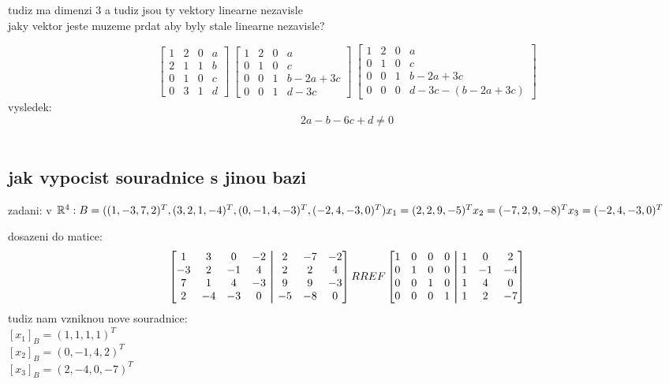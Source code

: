 \documentclass[a4paper]{article}
\newcommand\aug{\fboxsep=-\fboxrule\!\!\!\fbox{\strut}\!\!\!}
\begin{document}
tudiz ma dimenzi 3 a tudiz jsou ty vektory linearne nezavisle
\\
jaky vektor jeste muzeme prdat aby byly stale linearne nezavisle?

$$
\begin{bmatrix}
	1 & 2 & 0 & a \\
	2 & 1 & 1 & b \\
	0 & 1 & 0 & c \\
	0 & 3 & 1 & d 
\end{bmatrix}
~
\begin{bmatrix}
	1 & 2 & 0 & a \\
	0 & 1 & 0 & c \\
	0 & 0 & 1 & b-2a+3c \\
	0 & 0 & 1 & d-3c 
\end{bmatrix}
~
\begin{bmatrix}
	1 & 2 & 0 & a \\
	0 & 1 & 0 & c \\
	0 & 0 & 1 & b-2a+3c \\
	0 & 0 & 0 & d-3c-(b-2a+3c) 
\end{bmatrix}
$$
vysledek:
$$ 2a - b - 6c + d \neq 0 $$
\\


\subsection{jak vypocist souradnice s jinou bazi}
zadani: v $\mathbb{R}^4:\\
B=((1,-3,7,2)^T,(3,2,1,-4)^T,(0,-1, 4,-3)^T,(-2, 4, -3, 0)^T)\\
x_1=(2, 2, 9, -5)^T \\
x_2=(-7, 2, 9, -8)^T \\
x_3=(-2, 4, -3, 0)^T \\
$

dosazeni do matice:
$$
\begin{bmatrix}
	1 & 3 & 0 & -2 &\aug& 2&-7 &-2 \\
	-3 & 2 &-1 &4  &\aug& 2&2 &4 \\
	7 & 1 & 4 &-3  &\aug& 9& 9 & -3 \\
	2 & -4& -3 & 0 &\aug& -5& -8 &0
\end{bmatrix}
RREF
\begin{bmatrix}
	1 & 0 & 0 & 0 &\aug& 1 & 0 & 2 \\
	0 & 1 & 0 & 0 &\aug& 1 &-1 &-4 \\
	0 & 0 & 1 & 0 &\aug& 1 & 4 & 0 \\
	0 & 0 & 0 & 1 &\aug& 1 & 2 & -7
\end{bmatrix}
$$
tudiz nam vzniknou nove souradnice:\\
$[x_1]_B = (1, 1, 1, 1)^T  $\\
$[x_2]_B = (0, -1, 4, 2)^T $\\
$[x_3]_B = (2, -4, 0, -7)^T$
\end{document}
